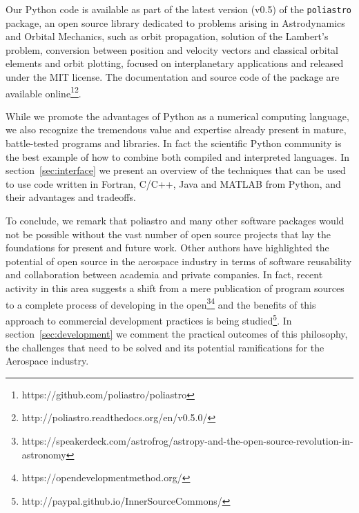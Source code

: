 Our Python code is available as part of the latest version (v0.5) of the \verb|poliastro| package, an open source library dedicated to problems arising in Astrodynamics and Orbital Mechanics, such as orbit propagation, solution of the Lambert's problem, conversion between position and velocity vectors and classical orbital elements and orbit plotting, focused on interplanetary applications and released under the MIT license. The documentation and source code of the package are available online\footnote{https://github.com/poliastro/poliastro}\footnote{http://poliastro.readthedocs.org/en/v0.5.0/}.

While we promote the advantages of Python as a numerical computing language, we also recognize the tremendous value and expertise already present in mature, battle-tested programs and libraries. In fact the scientific Python community is the best example of how to combine both compiled and interpreted languages. In section~\ref{sec:interface} we present an overview of the techniques that can be used to use code written in Fortran, C/C++, Java and MATLAB from Python, and their advantages and tradeoffs.

To conclude, we remark that poliastro and many other software packages would not be possible without the vast number of open source projects that lay the foundations for present and future work. Other authors have highlighted the potential of open source in the aerospace industry in terms of software reusability and collaboration between academia and private companies\citep{Ziemer2012}. In fact, recent activity in this area suggests a shift from a mere publication of program sources to a complete process of developing in the open\footnote{https://speakerdeck.com/astrofrog/astropy-and-the-open-source-revolution-in-astronomy}\footnote{https://opendevelopmentmethod.org/} and the benefits of this approach to commercial development practices is being studied\footnote{http://paypal.github.io/InnerSourceCommons/}. In section~\ref{sec:development} we comment the practical outcomes of this philosophy, the challenges that need to be solved and its potential ramifications for the Aerospace industry.
